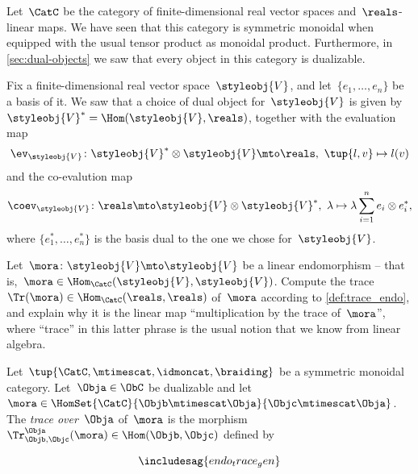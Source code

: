 \begin{gradedexercise}
    \label{ex:LinearAlgebraTrace}
    Let~$\CatC$ be the category of finite-dimensional real vector spaces and~$\reals$-linear maps.
    We have seen that this category is symmetric monoidal when equipped with the usual tensor product as monoidal product.
    Furthermore, in \cref{sec:dual-objects} we saw that every object in this category is dualizable.

    Fix a finite-dimensional real vector space~$\styleobj{V}$, and let~$\{e_1,\ldots,e_n \}$ be a basis of it.
    We saw that a choice of dual object for~$\styleobj{V}$ is given by~$\styleobj{V}^* = \Hom(\styleobj{V}, \reals)$, together with the evaluation map
    \begin{equation}
        \ev_\styleobj{V}  \colon \styleobj{V}^* \otimes \styleobj{V}  \mto \reals, \ \tup{l, v} \mapsto l(v)
    \end{equation}
    and the co-evalution map
    \begin{equation}
        \coev_\styleobj{V}  \colon \reals \mto \styleobj{V}  \otimes \styleobj{V}^*, \ \lambda \mapsto \lambda \sum_{i=1}^n e_i \otimes e_i^*,
    \end{equation}
    where $\{e_1^*,\ldots,e_n^* \}$ is the basis dual to the one we chose for~$\styleobj{V}$.

    Let~$\mora\colon \styleobj{V} \mto \styleobj{V}$ be a linear endomorphism -- that is,~$\mora \in \Hom_\CatC(\styleobj{V}, \styleobj{V})$.
    Compute the trace~$\Tr(\mora) \in \Hom_\CatC(\reals, \reals)$ of~$\mora$ according to \cref{def:trace_endo}, and explain why it is the linear map ``multiplication by the trace of~$\mora$'', where ``trace'' in this latter phrase is the usual notion that we know from linear algebra.
\end{gradedexercise}


\begin{ctdefinition}
    \label{def:trace_gen_endo}
    Let~$\tup{\CatC,\mtimescat,\idmoncat, \braiding}$ be a symmetric monoidal category.
    Let~$\Obja \in \ObC$ be dualizable and let~$\mora \in \HomSet{\CatC}{\Objb \mtimescat \Obja}{\Objc \mtimescat \Obja}$.
    The \emph{trace over}~$\Obja$ of~$\mora$ is the morphism~$\Tr_{\Objb, \Objc}^\Obja (\mora) \in \Hom(\Objb, \Objc)$ defined by
    \begin{widepar}
    \begin{equation}
        \includesag{endo_trace_gen}
    \end{equation}
\end{widepar}
\end{ctdefinition}


